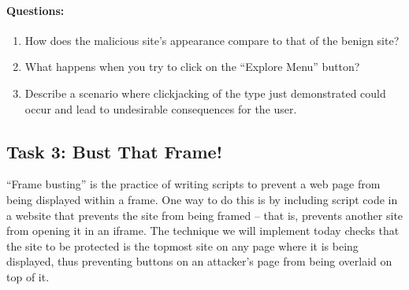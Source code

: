 \paragraph{Questions:}
\begin{enumerate}
    \item How does the malicious site’s appearance compare to that of
the benign site?
    \item What happens when you try to click on the ``Explore Menu'' button?
    \item Describe a scenario where clickjacking of the type just
    demonstrated could occur and lead to undesirable consequences for 
    the user.
\end{enumerate}



\subsection{Task 3: Bust That Frame!}
``Frame busting'' is the practice of writing scripts to prevent a web
page from being displayed within a frame.  One way to do this is by
including script code in a website that prevents the site from being
framed -- that is, prevents another site from opening it in an iframe.
The technique we will implement today checks that the site to be
protected is the topmost site on any page where it is being displayed,
thus preventing buttons on an attacker's page from being overlaid on top
of it. 

